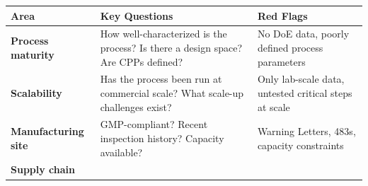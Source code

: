 \documentclass[
  11pt,
  a4paper,
]{report}
\begin{document}
\begin{longtable}[]{@{}lll@{}}
\toprule
\begin{minipage}[b]{0.18\columnwidth}\raggedright
Area\strut
\end{minipage} & \begin{minipage}[b]{0.40\columnwidth}\raggedright
Key Questions\strut
\end{minipage} & \begin{minipage}[b]{0.33\columnwidth}\raggedright
Red Flags\strut
\end{minipage}\tabularnewline
\midrule
\endhead
\begin{minipage}[t]{0.18\columnwidth}\raggedright
\textbf{Process maturity}\strut
\end{minipage} & \begin{minipage}[t]{0.40\columnwidth}\raggedright
How well-characterized is the process? Is there a design space? Are CPPs
defined?\strut
\end{minipage} & \begin{minipage}[t]{0.33\columnwidth}\raggedright
No DoE data, poorly defined process parameters\strut
\end{minipage}\tabularnewline
\begin{minipage}[t]{0.18\columnwidth}\raggedright
\textbf{Scalability}\strut
\end{minipage} & \begin{minipage}[t]{0.40\columnwidth}\raggedright
Has the process been run at commercial scale? What scale-up challenges
exist?\strut
\end{minipage} & \begin{minipage}[t]{0.33\columnwidth}\raggedright
Only lab-scale data, untested critical steps at scale\strut
\end{minipage}\tabularnewline
\begin{minipage}[t]{0.18\columnwidth}\raggedright
\textbf{Manufacturing site}\strut
\end{minipage} & \begin{minipage}[t]{0.40\columnwidth}\raggedright
GMP-compliant? Recent inspection history? Capacity available?\strut
\end{minipage} & \begin{minipage}[t]{0.33\columnwidth}\raggedright
Warning Letters, 483s, capacity constraints\strut
\end{minipage}\tabularnewline
\begin{minipage}[t]{0.18\columnwidth}\raggedright
\textbf{Supply chain}\strut
\end{minipage} & \begin{minipage}[t]{0.40\columnwidth}\raggedright

\end{minipage}
\end{longtable}
\end{document}
